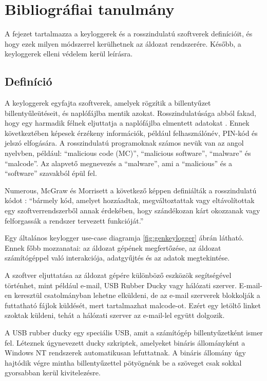 \documentclass[12pt,a4paper,oneside]{report}
\begin{document}
\chapter{Bibliográfiai tanulmány}\label{sec:bibl}
A fejezet tartalmazza a keyloggerek és a rosszindulatú szoftverek definícióit, és hogy ezek milyen módszerrel kerülhetnek az áldozat rendszerére. Később, a keyloggerek elleni védelem kerül leírásra.

\section{Definíció}
A keyloggerek egyfajta szoftverek, amelyek rögzítik a billentyűzet billentyűleütéseit, és naplófájlba mentik azokat. Rosszindulatúsága abból fakad, hogy egy harmadik félnek eljuttatja a naplófájlba elmentett adatokat \parencite{ahmed2014survey}. Ennek következtében képesek érzékeny információk, például felhasználónév, PIN-kód és jelszó elfogására.  A rosszindulatú programoknak számos nevük van az angol nyelvben, például: ``malicious code (MC)'', ``malicious software'', ``malware'' és ``malcode''. Az alapvető megnevezés a ``malware'', ami a ``malicious'' és a ``software'' szavakból épül fel. 

Numerous, McGraw és Morrisett a következő képpen definiálták a rosszindulatú kódot \cite{ahmed2014survey}: ``bármely kód, amelyet hozzáadtak, megváltoztattak vagy eltávolítottak egy szoftverrendszerből annak érdekében, hogy szándékozan kárt okozzanak vagy felforgassák a rendszer tervezett funkcióját.''

Egy általános keylogger use-case diagramja \ref{fig:genkeylogger} ábrán látható. Ennek főbb mozzanatai: az áldozat gépének megfertőzése, az áldozat számítógéppel való interakciója, adatgyűjtés és az adatok megtekintése.

A szoftver eljuttatása az áldozat gépére különböző eszközök segítségével történhet, mint például e-mail, USB Rubber Ducky vagy hálózati szerver. E-mail-en keresztül csatolmányban lehetne elküldeni, de az e-mail szerverek blokkolják a futtatható fájlok küldését, mert tartalmazhat malcode-ot. Ezért egy letöltő linket szoktak küldeni, tehát a hálózati szerver az e-mail-lel együtt dolgozik.

A USB rubber ducky egy speciális USB, amit a számítógép billentyűzetként ismer fel. Léteznek úgynevezett ducky szkriptek, amelyeket bináris állományként a Windows NT rendszerek automatikusan lefuttatnak. A bináris állomány úgy hajtódik végre mintha billentyűzettel pötyögnénk be a szöveget csak sokkal gyorsabban kerül kivitelezésre.
\end{document}
